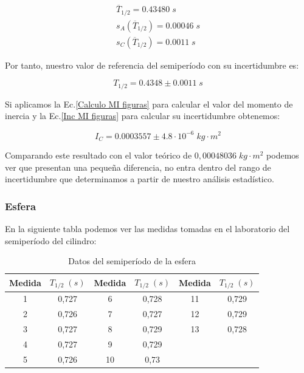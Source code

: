 \documentclass[a4paper,12pt,titlepage]{article}
\begin{document}
\begin{equation}
    \begin{gathered}
        \overline{T}_{1/2} = 0.43480 \; s \\
        s_A(\overline{T}_{1/2}) = 0.00046 \; s \\
        s_C(\overline{T}_{1/2}) = 0.0011 \; s
    \end{gathered}
\end{equation}

Por tanto, nuestro valor de referencia del semiperíodo con su incertidumbre es:

\begin{equation}
    T_{1/2} = 0.4348 \pm 0.0011 \; s
\end{equation}

Si aplicamos la Ec.\ref{Calculo MI figuras} para calcular el valor del momento de inercia y la Ec.\ref{Inc MI figuras} para calcular su incertidumbre obtenemos:

\begin{equation}
    I_C = 0.0003557 \pm 4.8 \cdot 10^{-6} \; kg\cdot m^2
\end{equation}

Comparando este resultado con el valor teórico de $0,00048036 \; kg \cdot m^2$ podemos ver que presentan una pequeña diferencia, no entra dentro del rango de incertidumbre que determinamos a partir de nuestro análisis estadístico.

\subsubsection{Esfera}

En la siguiente tabla podemos ver las medidas tomadas en el laboratorio del semiperíodo del cilindro:

\begin{table}[h!]
    \centering
    \begin{tabular}{|c|c|c|c|cc}
    \hline
    Medida  &  $T_{1/2}\; (s)$ & Medida   & $T_{1/2}\; (s)$   & \multicolumn{1}{c|}{Medida}   & \multicolumn{1}{c|}{$T_{1/2}\; (s)$}      \\ \hline
    1 & 0,727 & 6  & 0,728 & \multicolumn{1}{c|}{11} & \multicolumn{1}{c|}{0,729} \\ \hline
    2 & 0,726 & 7  & 0,727 & \multicolumn{1}{c|}{12} & \multicolumn{1}{c|}{0,729} \\ \hline
    3 & 0,727 & 8  & 0,729 & \multicolumn{1}{c|}{13} & \multicolumn{1}{c|}{0,728} \\ \hline
    4 & 0,727 & 9  & 0,729 &                         &                            \\ \cline{1-4}
    5 & 0,726 & 10 & 0,73  &                         &                            \\ \cline{1-4}
    \end{tabular}
    \caption{Datos del semiperíodo de la esfera}
    \label{Datos semiT esfera}
\end{table}
\end{document}
